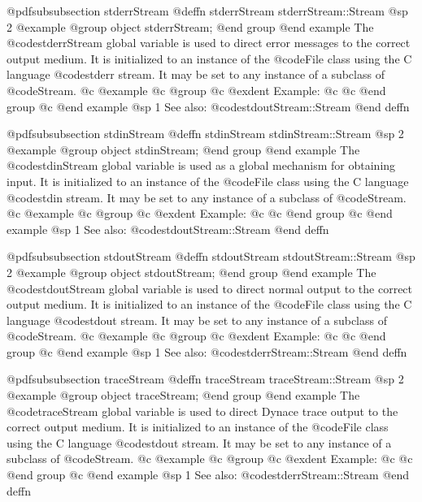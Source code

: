 @pdfsubsubsection {stderrStream}
@deffn {stderrStream} stderrStream::Stream
@sp 2
@example
@group
object  stderrStream;
@end group
@end example
The @code{stderrStream} global variable is used to direct error
messages to the correct output medium.  It is initialized to
an instance of the @code{File} class using the C language
@code{stderr} stream.  It may be set to any instance of a
subclass of @code{Stream}.
@c @example
@c @group
@c @exdent Example:
@c 
@c @end group
@c @end example
@sp 1
See also:  @code{stdoutStream::Stream}
@end deffn








@pdfsubsubsection {stdinStream}
@deffn {stdinStream} stdinStream::Stream
@sp 2
@example
@group
object  stdinStream;
@end group
@end example
The @code{stdinStream} global variable is used as a global mechanism for
obtaining input.  It is initialized to an instance of the @code{File}
class using the C language @code{stdin} stream.  It may be set to any
instance of a subclass of @code{Stream}.
@c @example
@c @group
@c @exdent Example:
@c 
@c @end group
@c @end example
@sp 1
See also:  @code{stdoutStream::Stream}
@end deffn








@pdfsubsubsection {stdoutStream}
@deffn {stdoutStream} stdoutStream::Stream
@sp 2
@example
@group
object  stdoutStream;
@end group
@end example
The @code{stdoutStream} global variable is used to direct normal
output to the correct output medium.  It is initialized to
an instance of the @code{File} class using the C language
@code{stdout} stream.  It may be set to any instance of a
subclass of @code{Stream}.
@c @example
@c @group
@c @exdent Example:
@c 
@c @end group
@c @end example
@sp 1
See also:  @code{stderrStream::Stream}
@end deffn










@pdfsubsubsection {traceStream}
@deffn {traceStream} traceStream::Stream
@sp 2
@example
@group
object  traceStream;
@end group
@end example
The @code{traceStream} global variable is used to direct Dynace
trace output to the correct output medium.  It is initialized to
an instance of the @code{File} class using the C language
@code{stdout} stream.  It may be set to any instance of a
subclass of @code{Stream}.
@c @example
@c @group
@c @exdent Example:
@c 
@c @end group
@c @end example
@sp 1
See also:  @code{stderrStream::Stream}
@end deffn










